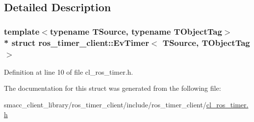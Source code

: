 \subsection{Detailed Description}
\subsubsection*{template$<$typename T\+Source, typename T\+Object\+Tag$>$\\*
struct ros\+\_\+timer\+\_\+client\+::\+Ev\+Timer$<$ T\+Source, T\+Object\+Tag $>$}



Definition at line 10 of file cl\+\_\+ros\+\_\+timer.\+h.



The documentation for this struct was generated from the following file\+:\begin{DoxyCompactItemize}
\item 
smacc\+\_\+client\+\_\+library/ros\+\_\+timer\+\_\+client/include/ros\+\_\+timer\+\_\+client/\hyperlink{cl__ros__timer_8h}{cl\+\_\+ros\+\_\+timer.\+h}\end{DoxyCompactItemize}
